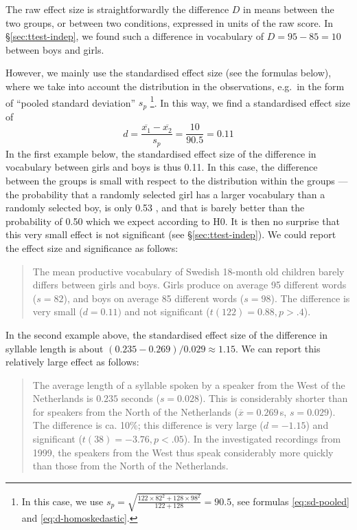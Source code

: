 \documentclass[
]{book}
\begin{document}
The raw effect size is straightforwardly the difference \(D\) in means
between the two groups, or between two conditions, expressed in units
of the raw score. In §\ref{sec:ttest-indep}, we found such a difference
in vocabulary of \(D=95-85=10\) between boys and girls.

However, we mainly use the standardised effect size (see
the formulas below), where we take into account the distribution in
the observations, e.g.~in the form of ``pooled standard deviation'' \(s_p\) \footnote{In this case, we use \(s_p = \sqrt{ \frac{122\times82^2+128\times98^2} {122+128} } = 90.5\), see formulas
  \eqref{eq:sd-pooled} and \eqref{eq:d-homoskedastic}.}.
In this way, we find a standardised effect size of
\begin{equation}
  \label{eq:d-standardized}
    d = \frac{ \overline{x_1}-\overline{x_2} } {s_p} = \frac{10}{90.5} = 0.11
\end{equation}
In the first example below, the standardised effect size of the difference in
vocabulary between girls and boys is thus 0.11. In this case, the difference
between the groups is small with respect to the distribution
within the groups --- the probability that a randomly selected girl
has a larger vocabulary than a randomly selected boy, is only 0.53 \citep{McGraw92},
and that is barely better than the probability of 0.50 which we expect according to H0.
It is then no surprise that this very small effect is not significant
(see §\ref{sec:ttest-indep}). We could
report the effect size and significance as follows:

\begin{quote}
The mean productive vocabulary of Swedish 18-month old children
barely differs between girls and boys. Girls
produce on average 95 different words (\(s=82\)), and boys
on average 85 different words (\(s=98\)). The difference is very
small (\(d=0.11)\) and not significant (\(t(122)=0.88, p>.4\)).
\end{quote}

In the second example above, the standardised effect size of the difference
in syllable length is about
\((0.235-0.269)/0.029 \approx 1.15\). We can report this relatively large
effect as follows:

\begin{quote}
The average length of a syllable spoken by a speaker from
the West of the Netherlands is \(0.235\) seconds (\(s=0.028\)). This is
considerably shorter than for speakers from the North of the Netherlands
(\(\overline{x}=0.269\) s, \(s=0.029\)). The difference is ca. 10\%; this
difference is very large (\(d=-1.15\)) and significant
(\(t(38)=-3.76, p<.05\)). In the investigated recordings from 1999, the
speakers from the West thus speak considerably more quickly than those from
the North of the Netherlands.
\end{quote}
\end{document}
